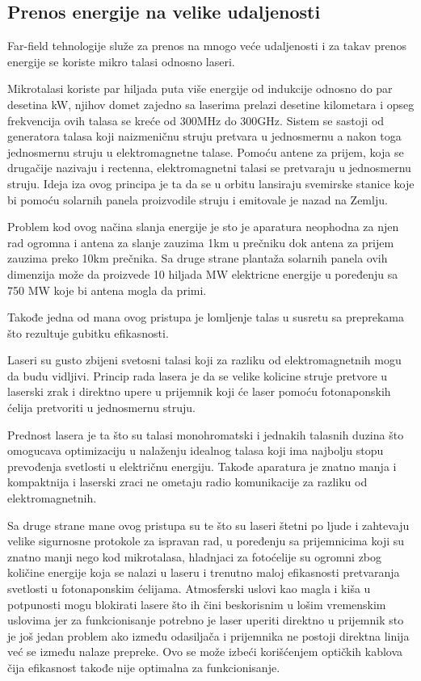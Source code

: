 \documentclass[a4paper]{article}
\begin{document}
\subsection{Prenos energije na velike udaljenosti}
\label{subsec:prenosenergijenavelikeudaljenosti}


Far-field tehnologije služe za prenos na mnogo veće udaljenosti i za takav prenos energije se koriste mikro talasi odnosno laseri.

Mikrotalasi koriste par hiljada puta više energije od indukcije odnosno do par desetina kW, njihov domet zajedno sa laserima prelazi desetine kilometara i opseg frekvencija ovih talasa se kreće od 300MHz do 300GHz. Sistem se sastoji od generatora talasa koji naizmeničnu struju pretvara u jednosmernu a nakon toga jednosmernu struju u elektromagnetne talase. Pomoću antene za prijem, koja se drugačije nazivaju i rectenna, elektromagnetni talasi se pretvaraju u jednosmernu struju. Ideja iza ovog principa je ta da se u orbitu lansiraju svemirske stanice koje bi pomoću solarnih panela proizvodile struju i emitovale je nazad na Zemlju.

Problem kod ovog načina slanja energije je sto je aparatura neophodna za njen rad ogromna i antena za slanje zauzima 1km u prečniku dok antena za prijem zauzima preko 10km prečnika. Sa druge strane plantaža solarnih panela ovih dimenzija može da proizvede 10 hiljada MW elektricne energije u poređenju sa 750 MW koje bi antena mogla da primi.

Takođe jedna od mana ovog pristupa je lomljenje talas u susretu sa preprekama što rezultuje gubitku efikasnosti.

Laseri su gusto zbijeni svetosni talasi koji za razliku od elektromagnetnih mogu da budu vidljivi. Princip rada lasera je da se velike kolicine struje pretvore u laserski zrak i direktno upere u prijemnik koji će laser pomoću fotonaponskih ćelija pretvoriti u jednosmernu struju.

Prednost lasera je ta što su talasi monohromatski i jednakih talasnih duzina što omogucava optimizaciju u nalaženju idealnog talasa koji ima najbolju stopu prevođenja svetlosti u električnu energiju. Takođe aparatura je znatno manja i kompaktnija i laserski zraci ne ometaju radio komunikacije za razliku od elektromagnetnih.

Sa druge strane mane ovog pristupa su te što su laseri štetni po ljude i zahtevaju velike sigurnosne protokole za ispravan rad, u poređenju sa prijemnicima koji su znatno manji nego kod mikrotalasa, hladnjaci za fotoćelije su ogromni zbog količine energije koja se nalazi u laseru i trenutno maloj efikasnosti pretvaranja svetlosti u fotonaponskim ćelijama. Atmosferski uslovi kao magla i kiša u potpunosti mogu blokirati lasere što ih čini beskorisnim u lošim vremenskim uslovima jer za funkcionisanje potrebno je laser uperiti direktno u prijemnik sto je još jedan problem ako između odasiljača i prijemnika ne postoji direktna linija već se između nalaze prepreke. Ovo se može izbeći korišćenjem optičkih kablova čija efikasnost takođe nije optimalna za funkcionisanje.
\end{document}
